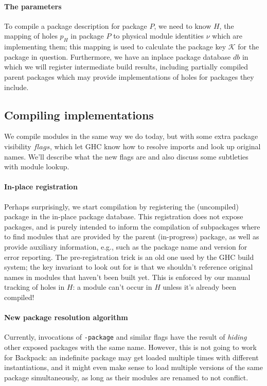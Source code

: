 \documentclass{article}
\begin{document}
\paragraph{The parameters} To compile a package description for package
$P$, we need to know $H$, the mapping of holes $p_H$ in package $P$ to
physical module identities $\nu$ which are implementing them; this
mapping is used to calculate the package key $\mathcal{K}$ for the
package in question.  Furthermore, we have an inplace package database
$db$ in which we will register intermediate build results, including
partially compiled parent packages which may provide implementations
of holes for packages they include.

\subsection{Compiling implementations}

We compile modules in the same way we do today, but with some extra
package visibility $flags$, which let GHC know how to resolve imports
and look up original names.  We'll describe what the new flags are
and also discuss some subtleties with module lookup.

\paragraph{In-place registration}  Perhaps surprisingly, we start
compilation by registering the (uncompiled) package in the in-place
package database.  This registration does not expose packages, and is
purely intended to inform the compilation of subpackages where to
find modules that are provided by the parent (in-progress) package,
as well as provide auxiliary information, e.g., such as the package name
and version for error reporting.  The pre-registration trick is an old
one used by the GHC build system; the key invariant to look out for
is that we shouldn't reference original names in modules that haven't
been built yet.  This is enforced by our manual tracking of holes in
$H$: a module can't occur in $H$ unless it's already been compiled!

\paragraph{New package resolution algorithm}  Currently, invocations
of \texttt{-package} and similar flags have the result of \emph{hiding}
other exposed packages with the same name.  However, this is not going
to work for Backpack: an indefinite package may get loaded multiple times
with different instantiations, and it might even make sense to load multiple
versions of the same package simultaneously, as long as their modules
are renamed to not conflict.
\end{document}
